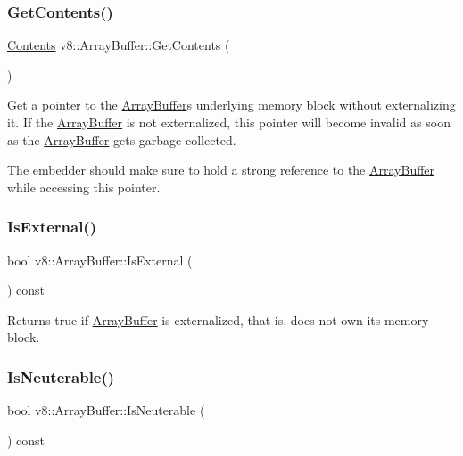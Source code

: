 \subsubsection{\texorpdfstring{Get\+Contents()}{GetContents()}}
{\footnotesize\ttfamily \mbox{\hyperlink{classv8_1_1ArrayBuffer_1_1Contents}{Contents}} v8\+::\+Array\+Buffer\+::\+Get\+Contents (\begin{DoxyParamCaption}{ }\end{DoxyParamCaption})}

Get a pointer to the \mbox{\hyperlink{classv8_1_1ArrayBuffer}{Array\+Buffer}}\textquotesingle{}s underlying memory block without externalizing it. If the \mbox{\hyperlink{classv8_1_1ArrayBuffer}{Array\+Buffer}} is not externalized, this pointer will become invalid as soon as the \mbox{\hyperlink{classv8_1_1ArrayBuffer}{Array\+Buffer}} gets garbage collected.

The embedder should make sure to hold a strong reference to the \mbox{\hyperlink{classv8_1_1ArrayBuffer}{Array\+Buffer}} while accessing this pointer. \mbox{\label{classv8_1_1ArrayBuffer_a22ecea76af2257b12bdb69b40d9bec8f}} 
\subsubsection{\texorpdfstring{Is\+External()}{IsExternal()}}
{\footnotesize\ttfamily bool v8\+::\+Array\+Buffer\+::\+Is\+External (\begin{DoxyParamCaption}{ }\end{DoxyParamCaption}) const}

Returns true if \mbox{\hyperlink{classv8_1_1ArrayBuffer}{Array\+Buffer}} is externalized, that is, does not own its memory block. \mbox{\label{classv8_1_1ArrayBuffer_a5de3f4c29744bd89204462f987ecb626}} 
\subsubsection{\texorpdfstring{Is\+Neuterable()}{IsNeuterable()}}
{\footnotesize\ttfamily bool v8\+::\+Array\+Buffer\+::\+Is\+Neuterable (\begin{DoxyParamCaption}{ }\end{DoxyParamCaption}) const}


